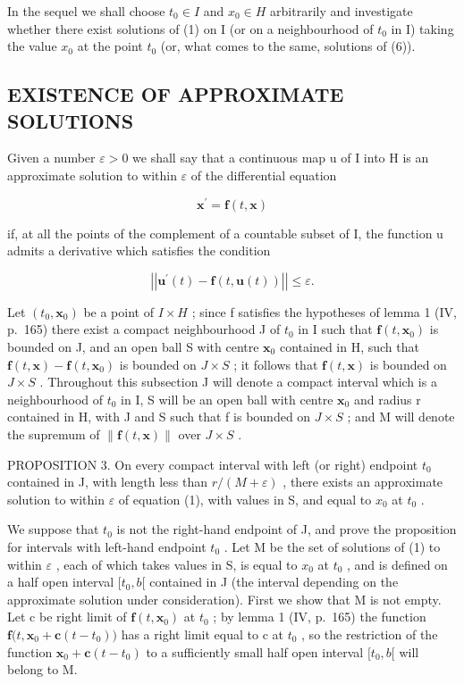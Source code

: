 In the sequel we shall choose \(t_{0} \in I\) and \(x_{0} \in H\) arbitrarily and investigate whether there exist solutions of (1) on I (or on a neighbourhood of \(t_{0}\) in I) taking the value \(x_{0}\) at the point \(t_{0}\) (or, what comes to the same, solutions of (6)).

\subsection{EXISTENCE OF APPROXIMATE SOLUTIONS}

Given a number \(\varepsilon > 0\) we shall say that a continuous map u of I into H is an approximate solution to within \(\varepsilon\) of the differential equation

\[
\mathbf {x} ^ {\prime} = \mathbf {f} (t, \mathbf {x})\tag{1}
\]

if, at all the points of the complement of a countable subset of I, the function u admits a derivative which satisfies the condition

\[
\left| \left| \mathbf {u} ^ {\prime} (t) - \mathbf {f} (t, \mathbf {u} (t)) \right| \right| \leqslant \varepsilon .\tag{7}
\]

Let \((t_{0}, \mathbf{x}_{0})\) be a point of \(I \times H\) ; since f satisfies the hypotheses of lemma 1 (IV, p.~165) there exist a compact neighbourhood J of \(t_{0}\) in I such that \(\mathbf{f}(t, \mathbf{x}_{0})\) is bounded on J, and an open ball S with centre \(\mathbf{x}_{0}\) contained in H, such that \(\mathbf{f}(t, \mathbf{x}) - \mathbf{f}(t, \mathbf{x}_{0})\) is bounded on \(J \times S\) ; it follows that \(\mathbf{f}(t, \mathbf{x})\) is bounded on \(J \times S\) . Throughout this subsection J will denote a compact interval which is a neighbourhood of \(t_{0}\) in I, S will be an open ball with centre \(\mathbf{x}_{0}\) and radius r contained in H, with J and S such that f is bounded on \(J \times S\) ; and M will denote the supremum of \(\| \mathbf{f}(t, \mathbf{x}) \|\) over \(J \times S\) .

PROPOSITION 3. On every compact interval with left (or right) endpoint \(t_{0}\) contained in J, with length less than \(r/(M + \varepsilon)\) , there exists an approximate solution to within \(\varepsilon\) of equation (1), with values in S, and equal to \(x_{0}\) at \(t_{0}\) .

We suppose that \(t_{0}\) is not the right-hand endpoint of J, and prove the proposition for intervals with left-hand endpoint \(t_{0}\) . Let M be the set of solutions of (1) to within \(\varepsilon\) , each of which takes values in S, is equal to \(x_{0}\) at \(t_{0}\) , and is defined on a half open interval \([t_{0}, b[\) contained in J (the interval depending on the approximate solution under consideration). First we show that M is not empty. Let c be right limit of \(\mathbf{f}(t, \mathbf{x}_{0})\) at \(t_{0}\) ; by lemma 1 (IV, p.~165) the function \(\mathbf{f}\big(t, \mathbf{x}_{0} + \mathbf{c}(t - t_{0})\big)\) has a right limit equal to c at \(t_{0}\) , so the restriction of the function \(\mathbf{x}_{0} + \mathbf{c}(t - t_{0})\) to a sufficiently small half open interval \([t_{0}, b[\) will belong to M.

